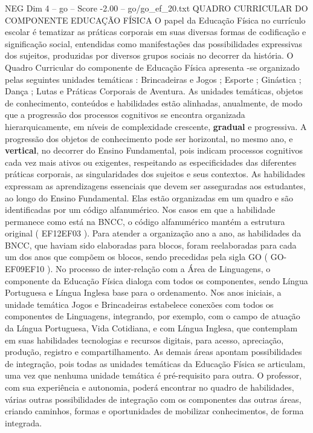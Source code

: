 \begin{textsample}{NEG Dim 4 – go – Score -2.00 – go/go\_ef\_20.txt}  \label{ex:f4_neg_224}
QUADRO CURRICULAR DO COMPONENTE EDUCAÇÃO FÍSICA O papel da Educação Física no currículo escolar é tematizar as práticas corporais em suas diversas formas de codificação e significação social, entendidas como manifestações das possibilidades expressivas dos sujeitos, produzidas por diversos grupos sociais no decorrer da história.
O Quadro Curricular do componente de Educação Física apresenta -se organizado pelas seguintes unidades temáticas : Brincadeiras e Jogos ; Esporte ; Ginástica ; Dança ; Lutas e Práticas Corporais de Aventura.
As unidades temáticas, objetos de conhecimento, conteúdos e habilidades estão alinhadas, anualmente, de modo que a progressão dos processos cognitivos se encontra organizada hierarquicamente, em níveis de complexidade crescente, \textbf{gradual} e progressiva.
A progressão dos objetos de conhecimento pode ser horizontal, no mesmo ano, e \textbf{vertical}, no decorrer do Ensino Fundamental, pois indicam processos cognitivos cada vez mais ativos ou exigentes, respeitando as especificidades das diferentes práticas corporais, as singularidades dos sujeitos e seus contextos.
As habilidades expressam as aprendizagens essenciais que devem ser asseguradas aos estudantes, ao longo do Ensino Fundamental.
Elas estão organizadas em um quadro e são identificadas por um código alfanumérico.
Nos casos em que a habilidade permanece como está na BNCC, o código alfanumérico mantém a estrutura original ( EF12EF03 ).
Para atender a organização ano a ano, as habilidades da BNCC, que haviam sido elaboradas para blocos, foram reelaboradas para cada um dos anos que compõem os blocos, sendo precedidas pela sigla GO ( GO-EF09EF10 ).
No processo de inter-relação com a Área de Linguagens, o componente da Educação Física dialoga com todos os componentes, sendo Língua Portuguesa e Língua Inglesa base para o ordenamento.
Nos anos iniciais, a unidade temática Jogos e Brincadeiras estabelece conexões com todos os componentes de Linguagens, integrando, por exemplo, com o campo de atuação da Língua Portuguesa, Vida Cotidiana, e com Língua Inglesa, que contemplam em suas habilidades tecnologias e recursos digitais, para acesso, apreciação, produção, registro e compartilhamento.
As demais áreas apontam possibilidades de integração, pois todas as unidades temáticas da Educação Física se articulam, uma vez que nenhuma unidade temática é pré-requisito para outra.
O professor, com sua experiência e autonomia, poderá encontrar no quadro de habilidades, várias outras possibilidades de integração com os componentes das outras áreas, criando caminhos, formas e oportunidades de mobilizar conhecimentos, de forma integrada.

\end{textsample}
